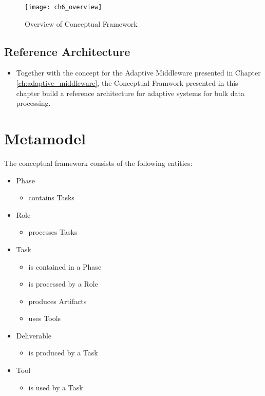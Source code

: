 \begin{figure}
	[htpb] \centering 
	\texttt{[image: ch6\_overview]} \caption{Overview of Conceptual Framework} \label{fig:ch6_overview} 
\end{figure}

\subsection{Reference Architecture}

\begin{itemize}
	\item Together with the concept for the Adaptive Middleware presented in Chapter \ref{ch:adaptive_middleware}, the Conceptual Framwork presented in this chapter build a reference architecture for adaptive systems for bulk data processing.
\end{itemize}

\section{Metamodel} 
The conceptual framework consists of the following entities:
\begin{itemize}
	\item Phase
	\begin{itemize}
		\item contains Tasks
	\end{itemize}
	\item Role
	\begin{itemize}
		\item processes Tasks
	\end{itemize}
	\item Task
	\begin{itemize}
		\item is contained in a Phase
		\item is processed by a Role
		\item produces Artifacts
		\item uses Tools
	\end{itemize}
	\item Deliverable
	\begin{itemize}
		\item is produced by a Task
	\end{itemize}
	\item Tool
	\begin{itemize}
		\item is used by a Task
	\end{itemize}
\end{itemize}

